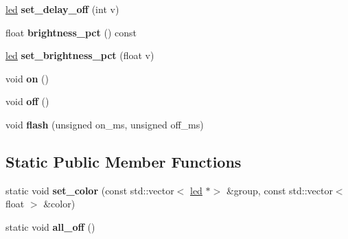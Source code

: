 \begin{DoxyCompactItemize}
\item 
\mbox{\label{classev3dev_1_1led_ac3b8ec6f0638ff8470c9febe78d50929}} 
\hyperlink{classev3dev_1_1led}{led} {\bfseries set\+\_\+delay\+\_\+off} (int v)
\item 
\mbox{\label{classev3dev_1_1led_ad184926eaa69b68a885d408e67a157e3}} 
float {\bfseries brightness\+\_\+pct} () const
\item 
\mbox{\label{classev3dev_1_1led_ae6c8bb973043f486bfef979390908422}} 
\hyperlink{classev3dev_1_1led}{led} {\bfseries set\+\_\+brightness\+\_\+pct} (float v)
\item 
\mbox{\label{classev3dev_1_1led_af2cb9811889350d99d30482cb4ad9269}} 
void {\bfseries on} ()
\item 
\mbox{\label{classev3dev_1_1led_a9cd4597b1025c7a08ab46a6b27dc498c}} 
void {\bfseries off} ()
\item 
\mbox{\label{classev3dev_1_1led_a0275b209b0a8d0a244b7ae3dd79c8eca}} 
void {\bfseries flash} (unsigned on\+\_\+ms, unsigned off\+\_\+ms)
\end{DoxyCompactItemize}
\subsection*{Static Public Member Functions}
\begin{DoxyCompactItemize}
\item 
\mbox{\label{classev3dev_1_1led_ab01e81e30f9bc794ed6e968740ac8cfa}} 
static void {\bfseries set\+\_\+color} (const std\+::vector$<$ \hyperlink{classev3dev_1_1led}{led} $\ast$$>$ \&group, const std\+::vector$<$ float $>$ \&color)
\item 
\mbox{\label{classev3dev_1_1led_a1acf1f07f6dd1a74d7596fd4618908d1}} 
static void {\bfseries all\+\_\+off} ()
\end{DoxyCompactItemize}
